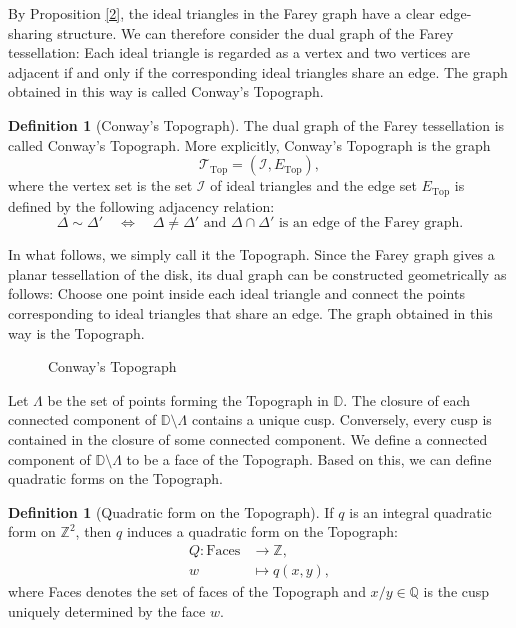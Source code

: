 \documentclass[10pt, a4paper]{article}
\newcommand{\Z}{\mathbb{Z}}
\newcommand{\Q}{\mathbb{Q}}
\newcommand{\D}{\mathbb{D}}
\theoremstyle{definition}
\newtheorem{definition}[theorem]{Definition}
\theoremstyle{remark}
\begin{document}
By Proposition \ref{2}, the ideal triangles in the Farey graph have a clear edge-sharing structure. We can therefore consider the dual graph of the Farey tessellation: Each ideal triangle is regarded as a vertex and two vertices are adjacent if and only if the corresponding ideal triangles share an edge. The graph obtained in this way is called Conway's Topograph.

\begin{definition}[Conway's Topograph]
The dual graph of the Farey tessellation is called Conway's Topograph. More explicitly, Conway's Topograph is the graph
\[
    \mathcal T_{\mathrm{Top}}=(\mathcal I,E_{\mathrm{Top}}),
\]
where the vertex set is the set \(\mathcal I\) of ideal triangles and the edge set \(E_{\mathrm{Top}}\) is defined by the following adjacency relation:
\[
    \Delta\sim \Delta'
    \quad\Longleftrightarrow\quad
    \Delta\neq \Delta'
    \text{ and }
    \Delta\cap\Delta'
    \text{ is an edge of the Farey graph}.
\]
\end{definition}

In what follows, we simply call it the Topograph. Since the Farey graph gives a planar tessellation of the disk, its dual graph can be constructed geometrically as follows: Choose one point inside each ideal triangle and connect the points corresponding to ideal triangles that share an edge. The graph obtained in this way is the Topograph.

\begin{figure}[H]
    \centering
    \caption{Conway's Topograph}
    \label{fig:farey_disk}
\end{figure}

Let \(\Lambda\) be the set of points forming the Topograph in \(\D\). The closure of each connected component of \(\D\setminus\Lambda\) contains a unique cusp. Conversely, every cusp is contained in the closure of some connected component. We define a connected component of \(\D\setminus\Lambda\) to be a face of the Topograph. Based on this, we can define quadratic forms on the Topograph.

\begin{definition}[Quadratic form on the Topograph]
    If \(q\) is an integral quadratic form on \(\Z^2\), then \(q\) induces a quadratic form on the Topograph:
    \begin{align*}
        Q: \text{Faces} &\to \Z,\\
        w &\mapsto q(x,y),
    \end{align*}
    where Faces denotes the set of faces of the Topograph and \(x/y\in\Q\) is the cusp uniquely determined by the face \(w\).
\end{definition}
\end{document}
